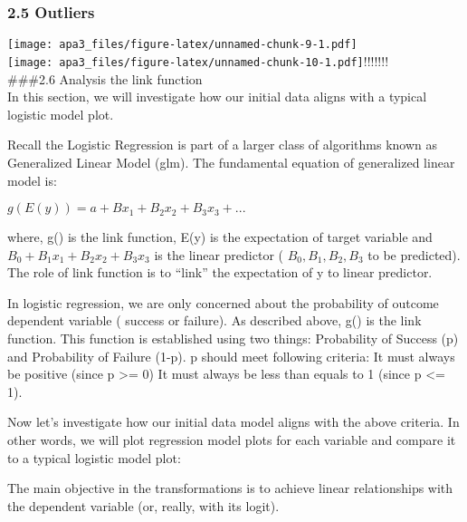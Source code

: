 \documentclass[english,man]{apa6}
\begin{document}
\subsubsection{2.5 Outliers}\label{outliers}

\texttt{[image: apa3\_files/figure-latex/unnamed-chunk-9-1.pdf]}\\

\texttt{[image: apa3\_files/figure-latex/unnamed-chunk-10-1.pdf]}!\href{apa3_files/figure-latex/unnamed-chunk-10-2.pdf}{}!\href{apa3_files/figure-latex/unnamed-chunk-10-3.pdf}{}!\href{apa3_files/figure-latex/unnamed-chunk-10-4.pdf}{}!\href{apa3_files/figure-latex/unnamed-chunk-10-5.pdf}{}!\href{apa3_files/figure-latex/unnamed-chunk-10-6.pdf}{}!\href{apa3_files/figure-latex/unnamed-chunk-10-7.pdf}{}!\href{apa3_files/figure-latex/unnamed-chunk-10-8.pdf}{}\\
 \#\#\#2.6 Analysis the link function\\
 In this section, we will investigate how our initial data aligns with a
typical logistic model plot.

Recall the Logistic Regression is part of a larger class of algorithms
known as Generalized Linear Model (glm). The fundamental equation of
generalized linear model is:

\(g(E(y)) = a+ Bx_1+B_2x_2+ B_3x_3+...\)

where, g() is the link function, E(y) is the expectation of target
variable and \(B_0 + B_1x_1 + B_2x_2+B_3x_3\) is the linear predictor (
\(B_0,B_1,B_2, B_3\) to be predicted). The role of link function is to
\enquote{link} the expectation of y to linear predictor.

In logistic regression, we are only concerned about the probability of
outcome dependent variable ( success or failure). As described above,
g() is the link function. This function is established using two things:
Probability of Success (p) and Probability of Failure (1-p). p should
meet following criteria: It must always be positive (since p
\textgreater{}= 0) It must always be less than equals to 1 (since p
\textless{}= 1).

Now let's investigate how our initial data model aligns with the above
criteria. In other words, we will plot regression model plots for each
variable and compare it to a typical logistic model plot:

The main objective in the transformations is to achieve linear
relationships with the dependent variable (or, really, with its logit).
\end{document}

